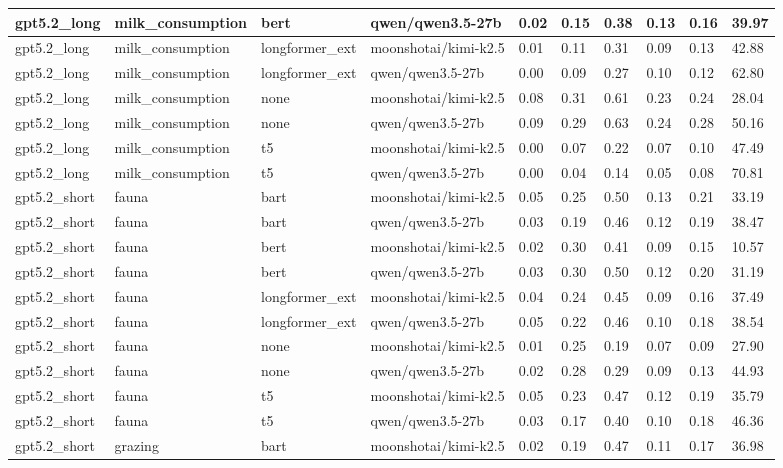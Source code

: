 \begin{tabular}{|l|l|l|l|l|l|l|l|l|l|}
 \hline
 gpt5.2\_long & milk\_consumption & bert & qwen/qwen3.5-27b & 0.02 & 0.15 & 0.38 & 0.13 & 0.16 & 39.97 \\
 \hline
 gpt5.2\_long & milk\_consumption & longformer\_ext & moonshotai/kimi-k2.5 & 0.01 & 0.11 & 0.31 & 0.09 & 0.13 & 42.88 \\
 \hline
 gpt5.2\_long & milk\_consumption & longformer\_ext & qwen/qwen3.5-27b & 0.00 & 0.09 & 0.27 & 0.10 & 0.12 & 62.80 \\
 \hline
 gpt5.2\_long & milk\_consumption & none & moonshotai/kimi-k2.5 & 0.08 & 0.31 & 0.61 & 0.23 & 0.24 & 28.04 \\
 \hline
 gpt5.2\_long & milk\_consumption & none & qwen/qwen3.5-27b & 0.09 & 0.29 & 0.63 & 0.24 & 0.28 & 50.16 \\
 \hline
 gpt5.2\_long & milk\_consumption & t5 & moonshotai/kimi-k2.5 & 0.00 & 0.07 & 0.22 & 0.07 & 0.10 & 47.49 \\
 \hline
 gpt5.2\_long & milk\_consumption & t5 & qwen/qwen3.5-27b & 0.00 & 0.04 & 0.14 & 0.05 & 0.08 & 70.81 \\
 \hline
 gpt5.2\_short & fauna & bart & moonshotai/kimi-k2.5 & 0.05 & 0.25 & 0.50 & 0.13 & 0.21 & 33.19 \\
 \hline
 gpt5.2\_short & fauna & bart & qwen/qwen3.5-27b & 0.03 & 0.19 & 0.46 & 0.12 & 0.19 & 38.47 \\
 \hline
 gpt5.2\_short & fauna & bert & moonshotai/kimi-k2.5 & 0.02 & 0.30 & 0.41 & 0.09 & 0.15 & 10.57 \\
 \hline
 gpt5.2\_short & fauna & bert & qwen/qwen3.5-27b & 0.03 & 0.30 & 0.50 & 0.12 & 0.20 & 31.19 \\
 \hline
 gpt5.2\_short & fauna & longformer\_ext & moonshotai/kimi-k2.5 & 0.04 & 0.24 & 0.45 & 0.09 & 0.16 & 37.49 \\
 \hline
 gpt5.2\_short & fauna & longformer\_ext & qwen/qwen3.5-27b & 0.05 & 0.22 & 0.46 & 0.10 & 0.18 & 38.54 \\
 \hline
 gpt5.2\_short & fauna & none & moonshotai/kimi-k2.5 & 0.01 & 0.25 & 0.19 & 0.07 & 0.09 & 27.90 \\
 \hline
 gpt5.2\_short & fauna & none & qwen/qwen3.5-27b & 0.02 & 0.28 & 0.29 & 0.09 & 0.13 & 44.93 \\
 \hline
 gpt5.2\_short & fauna & t5 & moonshotai/kimi-k2.5 & 0.05 & 0.23 & 0.47 & 0.12 & 0.19 & 35.79 \\
 \hline
 gpt5.2\_short & fauna & t5 & qwen/qwen3.5-27b & 0.03 & 0.17 & 0.40 & 0.10 & 0.18 & 46.36 \\
 \hline
 gpt5.2\_short & grazing & bart & moonshotai/kimi-k2.5 & 0.02 & 0.19 & 0.47 & 0.11 & 0.17 & 36.98 \\

\end{tabular}
